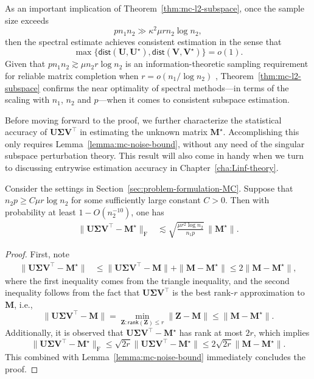 As an important implication of Theorem~\ref{thm:mc-l2-subspace}, once the sample size exceeds
$$pn_1n_2 \gg \kappa^{2}\mu r n_2  \log n_{2}, $$
then the spectral estimate achieves consistent estimation in the sense that
%
\[
	\max\Big\{ \mathsf{dist}\left(\bm{U},\bm{U}^{\star}\right),\mathsf{dist}\left(\bm{V},\bm{V}^{\star}\right)\Big\} = o(1).
\]
%
Given that $pn_1n_2\gtrsim \mu n_2 r \log n_2$ is an information-theoretic sampling requirement for reliable matrix completion when $r=o(n_1/\log n_2)$ \citep{candes2010NearOptimalMC},
Theorem~\ref{thm:mc-l2-subspace} confirms the near optimality of spectral methods---in terms of the scaling with $n_1$, $n_2$ and $p$---when it comes to consistent subspace estimation.



Before moving forward to the proof, we further characterize the statistical accuracy of $\bm{U}\bm{\Sigma}\bm{V}^{\top}$ in estimating the unknown matrix $\bm{M}^{\star}$. Accomplishing this only requires Lemma~\ref{lemma:mc-noise-bound}, without any need of the singular subspace perturbation theory. This result will also come in handy when we turn to discussing entrywise estimation accuracy in Chapter~\ref{cha:Linf-theory}.
%
\begin{theorem}
\label{thm:mc-l2-matrix}
Consider the settings in Section~\ref{sec:problem-formulation-MC}.
Suppose that $n_{2}p\geq C\mu r\log n_{2}$ for some sufficiently large constant
$C>0$. Then with probability at least $1-O(n_{2}^{-10})$, one has
%
\begin{align*}
\|\bm{U}\bm{\Sigma}\bm{V}^{\top}-\bm{M}^{\star}\|_{\mathrm{F}} & \lesssim\sqrt{\frac{\mu r^{2}\log n_{2}}{n_{1}p}}\, \big\| \bm{M}^{\star} \big\|.
\end{align*}
%
\end{theorem}
%
\begin{proof}
First, note
%
\begin{align*}
\|\bm{U}\bm{\Sigma}\bm{V}^{\top}-\bm{M}^{\star}\| &\leq\|\bm{U}\bm{\Sigma}\bm{V}^{\top}- \bm{M} \|+\|\bm{M} -\bm{M}^{\star}\| \leq2\|\bm{M}-\bm{M}^{\star}\|,
\end{align*}
%
where the first inequality comes from the triangle inequality, and the second inequality follows from the fact that $\bm{U}\bm{\Sigma}\bm{V}^{\top}$ is the best rank-$r$ approximation to $\bm{M}$,
i.e.,
$$\|\bm{U}\bm{\Sigma}\bm{V}^{\top}-\bm{M}\|=\min_{\bm{Z}: \mathsf{rank}(\bm{Z})\leq r}\|\bm{Z}-\bm{M}\| \leq \|\bm{M}-\bm{M}^{\star}\|. $$
Additionally, it is observed that $\bm{U}\bm{\Sigma}\bm{V}^{\top}-\bm{M}^{\star}$ has rank at most $2r$, which implies
%
\[
	\|\bm{U}\bm{\Sigma}\bm{V}^{\top}-\bm{M}^{\star}\|_{\mathrm{F}}\leq\sqrt{2r}\|\bm{U}\bm{\Sigma}\bm{V}^{\top}-\bm{M}^{\star}\| \leq 2\sqrt{2r} \big\|\bm{M} - \bm{M}^{\star} \big\|.
\]
%
This combined with Lemma~\ref{lemma:mc-noise-bound} immediately concludes the proof. \end{proof}

